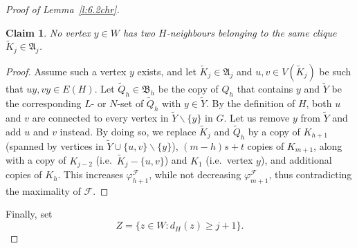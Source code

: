 \documentclass[reqno, 12pt]{amsart}
\numberwithin{equation}{section}
\numberwithin{figure}{section}
\theoremstyle{plain}
\newtheorem{claim}[thm]{Claim}
\theoremstyle{definition}
\let\phi=\varphi
\def\cF{{\mathcal F}}
\def\fA{\mathfrak{A}}
\def\fB{\mathfrak{B}}
\let\setminus=\smallsetminus
\begin{document}
\begin{proof}[Proof of Lemma~\ref{l:6.2chr}]
        \begin{claim}\label{c:no-two-H-neighbours}
            No vertex $y\in W$ has two $H$-neighbours belonging to the same clique $\tilde K_j \in \fA_j$.
        \end{claim}
        \begin{proof}
            Assume such a vertex $y$ exists, and let $\tilde K_j\in \fA_j$ and $u,v \in V(\tilde K_j)$ be such that $uy,vy\in E(H)$. Let $\tilde Q_h \in \fB_h$ be the copy of $Q_h$ that contains $y$ and $\tilde Y$ be the corresponding $L$- or $N$-set of $\tilde Q_h$ with $y\in \tilde Y$. By the definition of $H$, both $u$ and $v$ are connected to every vertex in $\tilde Y \setminus \{y\}$ in $G$. Let us remove $y$ from $\tilde Y$ and add $u$ and $v$ instead. By doing so, we replace $\tilde K_j$ and $\tilde Q_h$ by a copy of $K_{h+1}$ (spanned by vertices in $\tilde Y\cup\{u,v\}\setminus \{y\}$), $(m-h)s+t$ copies of $K_{m+1}$, along with a copy of $K_{j-2}$ (i.e.~$\tilde K_j - \{u,v\}$) and $K_1$ (i.e.~vertex $y$), and additional copies of $K_h$. This increases $\phi_{h+1}^\cF$, while not decreasing $\phi_{m+1}^\cF$, thus contradicting the maximality of $\cF$.
        \end{proof}
        
        Finally, set 
        \[ Z=\{z\in W\colon d_H(z)\geq j+1\}. \]


\end{proof}
\end{document}
